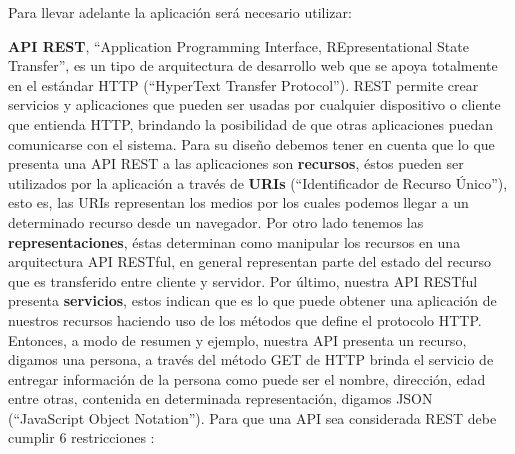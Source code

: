\documentclass[a4paper,twocolumn,12pt]{article}
\begin{document}
Para llevar adelante la aplicación será necesario utilizar:

\textbf{API REST}, ``Application Programming Interface, REpresentational State Transfer'', es un tipo de arquitectura de desarrollo web que se apoya totalmente en el estándar HTTP (``HyperText Transfer Protocol''). REST permite crear servicios y aplicaciones que pueden ser usadas por cualquier dispositivo o cliente que entienda HTTP, %
brindando la posibilidad de que otras aplicaciones puedan comunicarse con el sistema. Para su diseño debemos tener en cuenta que lo que presenta una API REST a las aplicaciones son \textbf{recursos}, éstos pueden ser utilizados por la aplicación a través de \textbf{URIs} (``Identificador de Recurso Único''), esto es, las URIs representan los medios por los cuales podemos llegar a un determinado recurso desde un navegador. Por otro lado tenemos las \textbf{representaciones}, éstas determinan como manipular los recursos en una arquitectura API RESTful, en general representan parte del estado del recurso que es transferido entre cliente y servidor. Por último, nuestra API RESTful presenta \textbf{servicios}, estos indican que es lo que puede obtener una aplicación de nuestros recursos haciendo uso de los métodos que define el protocolo HTTP. Entonces, a modo de resumen y ejemplo, nuestra API presenta un recurso, digamos una persona, a través del método GET de HTTP brinda el servicio de entregar información de la persona como puede ser el nombre, dirección, edad entre otras, contenida en determinada representación, digamos JSON (``JavaScript Object Notation''). Para que una API sea considerada REST debe cumplir 6 restricciones \cite{wiki:rest}:
\end{document}
